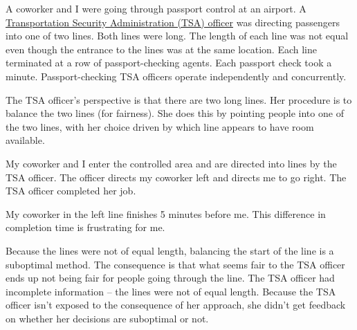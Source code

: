 \begin{mdframed}[frametitle={Airport Security Line},frametitlerule=true,frametitlealignment=\centering]
A coworker and I were going through passport control at an airport. 
A \href{https://en.wikipedia.org/wiki/Transportation_Security_Administration}{Transportation Security Administration (TSA) officer} 
was directing passengers into one of two lines. Both lines were long. The length of each line was not equal even though the entrance to the lines was at the same location. Each line terminated at a row of passport-checking agents. Each passport check took a minute. Passport-checking TSA officers operate independently and concurrently.


The TSA officer's perspective is that there are two long lines. Her procedure is to balance the two lines (for fairness). She does this by pointing people into one of the two lines, with her choice driven by which line appears to have room available.

My coworker and I enter the controlled area and are directed into lines by the TSA officer. The officer directs my coworker left and directs me to go right. The TSA officer completed her job.

My coworker in the left line finishes 5 minutes before me. This difference in completion time is frustrating for me.

Because the lines were not of equal length, balancing the start of the line is a suboptimal method. The consequence is that what seems fair to the TSA officer ends up not being fair for people going through the line. The TSA officer had incomplete information -- the lines were not of equal length. Because the TSA officer isn't exposed to the consequence of her approach, she didn't get feedback on whether her decisions are suboptimal or not.
\end{mdframed}

